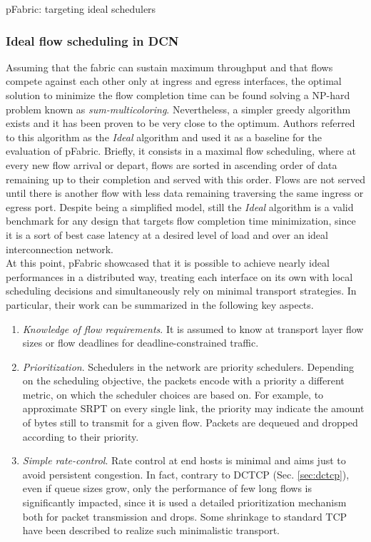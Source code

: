 \begin{subsection}{pFabric: targeting ideal schedulers}
\subsubsection{Ideal flow scheduling in DCN}
Assuming that the fabric can sustain maximum throughput and that flows compete against each other only at ingress and egress interfaces, the optimal solution to minimize the flow completion time can be found solving a NP-hard problem known as \textit{sum-multicoloring}. Nevertheless, a simpler greedy algorithm exists and it has been proven to be very close to the optimum. Authors referred to this algorithm as the \textit{Ideal} algorithm and used it as a baseline for the evaluation of pFabric.  Briefly, it consists in a maximal flow scheduling, where at every new flow arrival or depart, flows are sorted in ascending order of data remaining up to their completion and served with this order. Flows are not served until there is another flow with less data remaining traversing the same ingress or egress port. Despite being a simplified model, still the \textit{Ideal} algorithm is a valid benchmark for any design that targets flow completion time minimization, since it is a sort of best case latency at a desired level of load and over an ideal interconnection network. \\
At this point, pFabric showcased that it is possible to achieve nearly ideal performances in a distributed way, treating each interface on its own with local scheduling decisions and simultaneously rely on minimal transport strategies. In particular, their work can be summarized in the following key aspects. \\
\begin{enumerate}
	\item \textit{Knowledge of flow requirements}. It is assumed to know at transport layer flow sizes or flow deadlines for deadline-constrained traffic. 
	\item \textit{Prioritization}. Schedulers in the network are priority schedulers. Depending on the scheduling objective, the packets encode with a priority a different metric, on which the scheduler choices are based on. For example, to approximate SRPT on every single link, the priority may indicate the amount of bytes still to transmit for a given flow. Packets are dequeued and dropped according to their priority. 
	\item \textit{Simple rate-control}. Rate control at end hosts is minimal and aims just to avoid persistent congestion. In fact, contrary to DCTCP (Sec. \ref{sec:dctcp}), even if queue sizes grow, only the performance of few long flows is significantly impacted, since it is used a detailed prioritization mechanism both for packet transmission and drops. Some shrinkage to standard TCP have been described to realize such minimalistic transport.
\end{enumerate}
 

\end{subsection}
